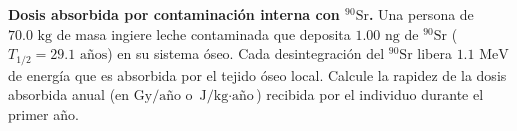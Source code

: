 \item \textbf{Dosis absorbida por contaminación interna con $^{90}\text{Sr}$.}
Una persona de $70.0\text{ kg}$ de masa ingiere leche contaminada que deposita $1.00\text{ ng}$ de $^{90}\text{Sr}$ ($T_{1/2} = 29.1\text{ años}$) en su sistema óseo. Cada desintegración del $^{90}\text{Sr}$ libera $1.1\text{ MeV}$ de energía que es absorbida por el tejido óseo local. Calcule la rapidez de la dosis absorbida anual (en $\text{Gy/año}$ o $\text{J/kg}\cdot\text{año}$) recibida por el individuo durante el primer año.